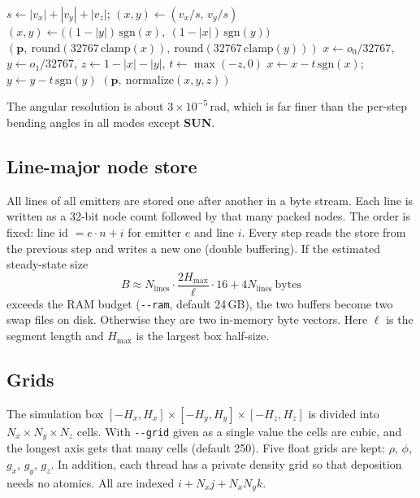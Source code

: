 \documentclass[12pt]{article}
\newcommand{\SUN}{\textcolor{sunc}{\textbf{\textsf{SUN}}}}
\newcommand{\opt}[1]{\texttt{-{}-#1}}
\newcommand{\vect}[1]{\mathbf{#1}}
\begin{document}
\begin{algorithm}[htbp]
\caption{Octahedral direction encoding (\texttt{packNode} / \texttt{unpackNode})}
\begin{algorithmic}[1]
\Function{Pack}{$\vect p, \vect v$}
  \State $s \gets |v_x|+|v_y|+|v_z|$; \quad $(x,y)\gets(v_x/s,\, v_y/s)$
   
     \State $(x,y)\gets\big((1-|y|)\,\mathrm{sgn}(x),\ (1-|x|)\,\mathrm{sgn}(y)\big)$
  \EndIf
  \State \Return $(\vect p,\ \mathrm{round}(32767\,\mathrm{clamp}(x)),\ \mathrm{round}(32767\,\mathrm{clamp}(y)))$
\EndFunction
\Function{Unpack}{$\vect p, o_0, o_1$}
  \State $x\gets o_0/32767$, $y\gets o_1/32767$, $z\gets 1-|x|-|y|$, $t\gets\max(-z,0)$
  \State $x \gets x - t\,\mathrm{sgn}(x)$; \quad $y\gets y - t\,\mathrm{sgn}(y)$
  \State \Return $(\vect p,\ \mathrm{normalize}(x,y,z))$
\EndFunction
\end{algorithmic}
\end{algorithm}

The angular resolution is about $3\times10^{-5}$\,rad, which is far finer than
the per-step bending angles in all modes except \SUN.

\subsection{Line-major node store}

All lines of all emitters are stored one after another in a byte stream. Each
line is written as a 32-bit node count followed by that many packed nodes. The
order is fixed: line id $= e\cdot n + i$ for emitter $e$ and line $i$. Every step
reads the store from the previous step and writes a new one (double buffering).
If the estimated steady-state size
\[
  B \approx N_\text{lines}\cdot\frac{2H_\text{max}}{\ell}\cdot 16 + 4N_\text{lines}\ \text{bytes}
\]
exceeds the RAM budget (\opt{ram}, default 24\,GB), the two buffers become two
swap files on disk. Otherwise they are two in-memory byte vectors. Here $\ell$ is
the segment length and $H_\text{max}$ is the largest box half-size.

\subsection{Grids}

The simulation box $[-H_x,H_x]\times[-H_y,H_y]\times[-H_z,H_z]$ is divided into
$N_x\times N_y\times N_z$ cells. With \opt{grid} given as a single value the cells are
cubic, and the longest axis gets that many cells (default 250). Five
float grids are kept: $\rho$, $\phi$, $g_x$, $g_y$, $g_z$. In addition, each
thread has a private density grid so that deposition needs no atomics. All are
indexed $i + N_x j + N_xN_y k$.
\end{document}
